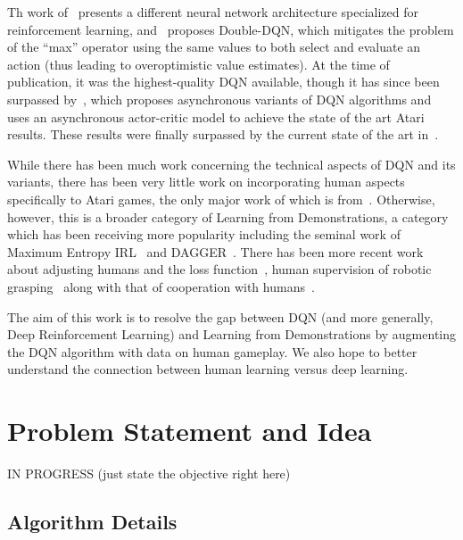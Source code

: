 \documentclass[letterpaper, 10pt, conference]{ieeeconf}
\begin{document}
Th work of~\cite{DBLP:conf/icml/WangSHHLF16} presents a different neural network
architecture specialized for reinforcement learning,
and~\cite{DBLP:conf/aaai/HasseltGS16} proposes Double-DQN, which mitigates
the problem of the ``max'' operator using the same values to both select and
evaluate an action (thus leading to overoptimistic value estimates). At the time
of publication, it was the highest-quality DQN available, though it has since
been surpassed by~\cite{DBLP:conf/icml/MnihBMGLHSK16}, which proposes
asynchronous variants of DQN algorithms and uses an asynchronous actor-critic
model to achieve the state of the art Atari results. These results were finally
surpassed by the current state of the art
in~\cite{DBLP:journals/corr/JaderbergMCSLSK16}.

While there has been much work concerning the technical aspects of DQN and its
variants, there has been very little work on incorporating human aspects
specifically to Atari games, the only major work of which is
from~\cite{DBLP:journals/corr/HosuR16}. Otherwise, however, this is a broader
category of Learning from Demonstrations, a category which has been receiving
more popularity including the seminal work of Maximum Entropy
IRL~\cite{Ziebart_2008_6055} and DAGGER~\cite{DBLP:journals/jmlr/RossGB11}.
There has been more recent work about adjusting humans and the loss
function~\cite{conf/nips/KimFPP13}, human supervision of robotic
grasping~\cite{DBLP:journals/corr/LaskeyCLMKJDG16,DBLP:dblp_conf/icra/LaskeySHMPDG16}
along with that of cooperation with humans~\cite{NIPS2016_6420}.

The aim of this work is to resolve the gap between DQN (and more generally, Deep
Reinforcement Learning) and Learning from Demonstrations by augmenting the DQN
algorithm with data on human gameplay. We also hope to better understand the
connection between human learning versus deep learning.



\section{Problem Statement and Idea}\label{sec:idea}

IN PROGRESS (just state the objective right here)

\subsection{Algorithm Details}\label{ssec:algorithm}
\end{document}
